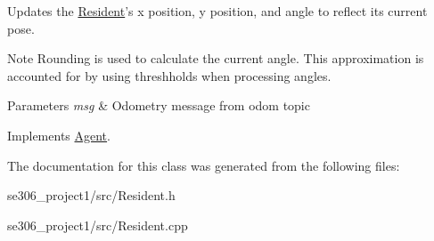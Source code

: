 Updates the \hyperlink{classResident}{Resident}'s x position, y position, and angle to reflect its current pose. 

\begin{DoxyNote}{Note}
Rounding is used to calculate the current angle. This approximation is accounted for by using threshholds when processing angles. 
\end{DoxyNote}

\begin{DoxyParams}{Parameters}
{\em msg} & Odometry message from odom topic \\
\hline
\end{DoxyParams}


Implements \hyperlink{classAgent}{Agent}.



The documentation for this class was generated from the following files\-:\begin{DoxyCompactItemize}
\item 
se306\-\_\-project1/src/Resident.\-h\item 
se306\-\_\-project1/src/Resident.\-cpp\end{DoxyCompactItemize}
